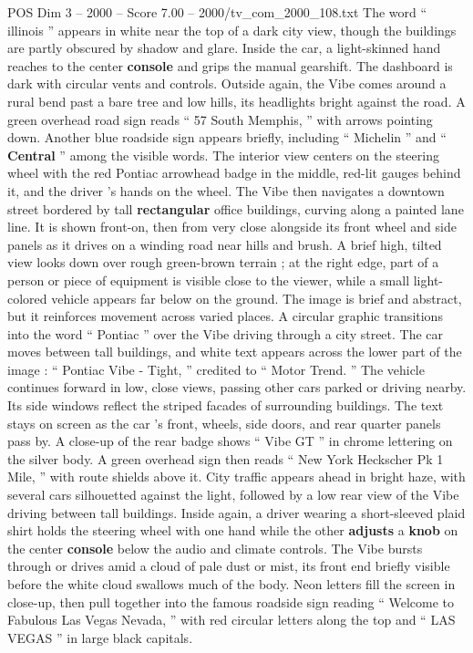 \begin{textsample}{POS Dim 3 – 2000 – Score 7.00 – 2000/tv\_com\_2000\_108.txt}
The word “ illinois ” appears in white near the top of a dark city view, though the buildings are partly obscured by shadow and glare.
Inside the car, a light-skinned hand reaches to the center \textbf{console} and grips the manual gearshift.
The dashboard is dark with circular vents and controls.
Outside again, the Vibe comes around a rural bend past a bare tree and low hills, its headlights bright against the road.
A green overhead road sign reads “ 57 South Memphis, ” with arrows pointing down.
Another blue roadside sign appears briefly, including “ Michelin ” and “ \textbf{Central} ” among the visible words.
The interior view centers on the steering wheel with the red Pontiac arrowhead badge in the middle, red-lit gauges behind it, and the driver ’s hands on the wheel.
The Vibe then navigates a downtown street bordered by tall \textbf{rectangular} office buildings, curving along a painted lane line.
It is shown front-on, then from very close alongside its front wheel and side panels as it drives on a winding road near hills and brush.
A brief high, tilted view looks down over rough green-brown terrain ; at the right edge, part of a person or piece of equipment is visible close to the viewer, while a small light-colored vehicle appears far below on the ground.
The image is brief and abstract, but it reinforces movement across varied places.
A circular graphic transitions into the word “ Pontiac ” over the Vibe driving through a city street.
The car moves between tall buildings, and white text appears across the lower part of the image : “ Pontiac Vibe - Tight, ” credited to “ Motor Trend. ” The vehicle continues forward in low, close views, passing other cars parked or driving nearby.
Its side windows reflect the striped facades of surrounding buildings.
The text stays on screen as the car ’s front, wheels, side doors, and rear quarter panels pass by.
A close-up of the rear badge shows “ Vibe GT ” in chrome lettering on the silver body.
A green overhead sign then reads “ New York Heckscher Pk 1 Mile, ” with route shields above it.
City traffic appears ahead in bright haze, with several cars silhouetted against the light, followed by a low rear view of the Vibe driving between tall buildings.
Inside again, a driver wearing a short-sleeved plaid shirt holds the steering wheel with one hand while the other \textbf{adjusts} a \textbf{knob} on the center \textbf{console} below the audio and climate controls.
The Vibe bursts through or drives amid a cloud of pale dust or mist, its front end briefly visible before the white cloud swallows much of the body.
Neon letters fill the screen in close-up, then pull together into the famous roadside sign reading “ Welcome to Fabulous Las Vegas Nevada, ” with red circular letters along the top and “ LAS VEGAS ” in large black capitals.

\end{textsample}
